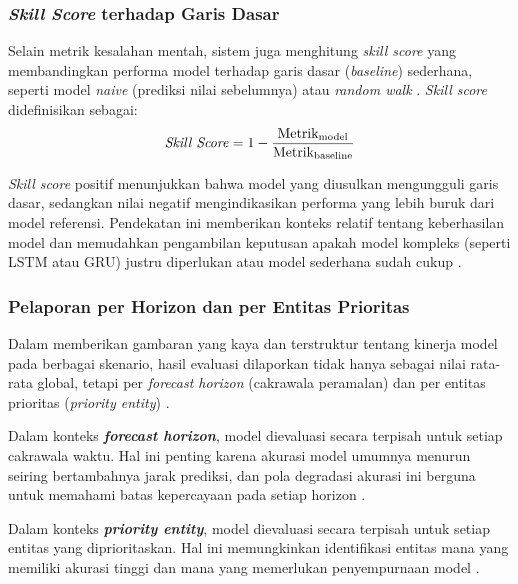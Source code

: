 \subsubsection{\textit{Skill Score} terhadap Garis Dasar}

Selain metrik kesalahan mentah, sistem juga menghitung \textit{skill score} yang membandingkan performa model terhadap garis dasar (\textit{baseline}) sederhana, seperti model \textit{naive} (prediksi nilai sebelumnya) atau \textit{random walk} \autocite{Petropoulos2023ForecastEval}. \textit{Skill score} didefinisikan sebagai:
\begin{equation}
\label{sym:SS}
\text{\textit{Skill Score}} = 1 - \frac{\text{Metrik}_{\text{model}}}{\text{Metrik}_{\text{baseline}}}
\end{equation}

\textit{Skill score} positif menunjukkan bahwa model yang diusulkan mengungguli garis dasar, sedangkan nilai negatif mengindikasikan performa yang lebih buruk dari model referensi. Pendekatan ini memberikan konteks relatif tentang keberhasilan model dan memudahkan pengambilan keputusan apakah model kompleks (seperti LSTM atau GRU) justru diperlukan atau model sederhana sudah cukup \autocite{Petropoulos2023ForecastEval,Spiliotis2020ForecastingBenchmarks}.

\subsubsection{Pelaporan per Horizon dan per Entitas Prioritas}

Dalam memberikan gambaran yang kaya dan terstruktur tentang kinerja model pada berbagai skenario, hasil evaluasi dilaporkan tidak hanya sebagai nilai rata-rata global, tetapi per \textit{forecast horizon} (cakrawala peramalan) dan per entitas prioritas (\textit{priority entity}) \autocite{Spiliotis2020ForecastingBenchmarks}.

Dalam konteks \textbf{\textit{forecast horizon}}, model dievaluasi secara terpisah untuk setiap cakrawala waktu. Hal ini penting karena akurasi model umumnya menurun seiring bertambahnya jarak prediksi, dan pola degradasi akurasi ini berguna untuk memahami batas kepercayaan pada setiap horizon \autocite{Petropoulos2023ForecastEval}.

Dalam konteks \textbf{\textit{priority entity}}, model dievaluasi secara terpisah untuk setiap entitas yang diprioritaskan. Hal ini memungkinkan identifikasi entitas mana yang memiliki akurasi tinggi dan mana yang memerlukan penyempurnaan model \autocite{Spiliotis2020ForecastingBenchmarks}.

